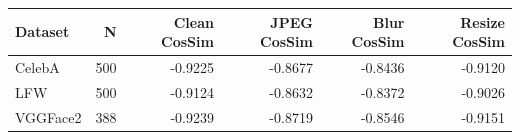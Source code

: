 \begin{tabular}{lrrrrr}
\toprule
Dataset & N & Clean CosSim & JPEG CosSim & Blur CosSim & Resize CosSim \\
\midrule
CelebA & 500 & -0.9225 & -0.8677 & -0.8436 & -0.9120 \\
LFW & 500 & -0.9124 & -0.8632 & -0.8372 & -0.9026 \\
VGGFace2 & 388 & -0.9239 & -0.8719 & -0.8546 & -0.9151 \\
\bottomrule
\end{tabular}
